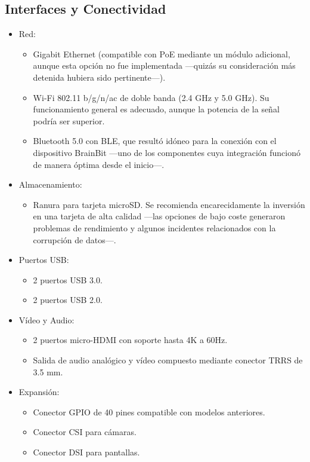     \subsection{Interfaces y Conectividad}
    \begin{itemize}
        \item Red:
        \begin{itemize}
            \item Gigabit Ethernet (compatible con PoE mediante un módulo adicional, aunque esta opción no fue implementada —quizás su consideración más detenida hubiera sido pertinente—).
            \item Wi-Fi 802.11 b/g/n/ac de doble banda (2.4 GHz y 5.0 GHz). Su funcionamiento general es adecuado, aunque la potencia de la señal podría ser superior.
            \item Bluetooth 5.0 con BLE, que resultó idóneo para la conexión con el dispositivo BrainBit —uno de los componentes cuya integración funcionó de manera óptima desde el inicio—.
        \end{itemize}
        \item Almacenamiento:
        \begin{itemize}
            \item Ranura para tarjeta microSD. Se recomienda encarecidamente la inversión en una tarjeta de alta calidad —las opciones de bajo coste generaron problemas de rendimiento y algunos incidentes relacionados con la corrupción de datos—.
        \end{itemize}
        \item Puertos USB:
        \begin{itemize}
            \item 2 puertos USB 3.0.
            \item 2 puertos USB 2.0.
        \end{itemize}
        \item Vídeo y Audio:
        \begin{itemize}
            \item 2 puertos micro-HDMI con soporte hasta 4K a 60Hz.
            \item Salida de audio analógico y vídeo compuesto mediante conector TRRS de 3.5 mm.
        \end{itemize}
        \item Expansión:
        \begin{itemize}
            \item Conector GPIO de 40 pines compatible con modelos anteriores.
            \item Conector CSI para cámaras.
            \item Conector DSI para pantallas.
        \end{itemize}
    \end{itemize}

